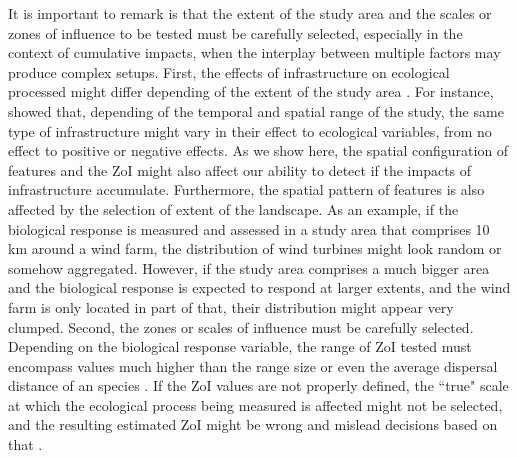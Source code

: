 \documentclass[titlepage]{article}
\begin{document}
It is important to remark is that the extent of the study area and the scales or zones of influence to be tested must be carefully selected, especially in the context of cumulative impacts, when the interplay between multiple factors may produce complex setups. First, the effects of infrastructure on ecological processed might differ depending of the extent of the study area \citep{vistnes_matter_2008}. For instance, \cite{skarin_human_2014} showed that, depending of the temporal and spatial range of the study, the same type of infrastructure might vary in their effect to ecological variables, from no effect to positive or negative effects. As we show here, the spatial configuration of features and the ZoI might also affect our ability to detect if the impacts of infrastructure accumulate. Furthermore, the spatial pattern of features is also affected by the selection of extent of the landscape. As an example, if the biological response is measured and assessed in a study area that comprises 10 km around a wind farm, the distribution of wind turbines might look random or somehow aggregated. However, if the study area comprises a much bigger area and the biological response is expected to respond at larger extents, and the wind farm is only located in part of that, their distribution might appear very clumped. Second, the zones or scales of influence must be carefully selected. Depending on the biological response variable, the range of ZoI tested must encompass values much higher than the range size or even the average dispersal distance of an species \citep{jackson_what_2012,miguet_what_2016}. If the ZoI values are not properly defined, the ``true" scale at which the ecological process being measured is affected might not be selected, and the resulting estimated ZoI might be wrong and mislead decisions based on that \citep[e.g.][]{jackson_are_2015}.
\end{document}
